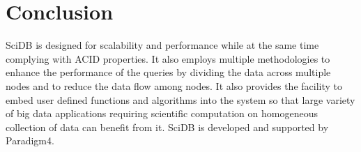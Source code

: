 \documentclass[9pt,twocolumn,twoside]{../../styles/osajnl}
\begin{document}
	\section{Conclusion}
	
	SciDB is designed for scalability and performance while at the same time complying with ACID properties. It also employs multiple methodologies to enhance the performance of the queries by dividing the data across multiple nodes and to reduce the data flow among nodes. It also provides the facility to embed user defined functions and algorithms into the system so that large variety of big data applications requiring scientific computation on homogeneous collection of data can benefit from it. SciDB is developed and supported by Paradigm4.
	
	
	
	
	
	
\end{document}
